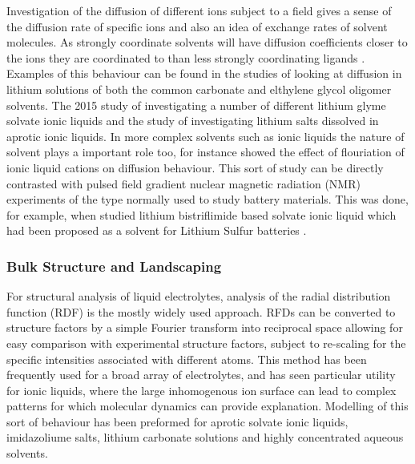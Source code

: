 \documentclass[../main.tex]{subfiles}
\begin{document}
Investigation of the diffusion of different ions subject to a field gives a sense of the diffusion rate of specific ions and also an idea of exchange rates of solvent molecules. As strongly coordinate solvents will have diffusion coefficients closer to the ions they are coordinated to than less strongly coordinating ligands \cite{shimizu_structural_2015, lesch_influence_2015, borodin_litfsi_2006,borodin_li_2006,borodin_li_2007}. Examples of this behaviour can be found in the studies of \citeauthor{borodin_li_2006} looking at diffusion in lithium solutions of both the common carbonate\cite{borodin_litfsi_2006} and elthylene glycol oligomer solvents\cite{borodin_li_2006}. The 2015 study of \citeauthor{shimizu_structural_2015} investigating a number of different lithium glyme solvate ionic liquids\cite{shimizu_structural_2015} and the study of \citeauthor{lesch_influence_2015} investigating lithium salts dissolved in aprotic ionic liquids.
In more complex solvents such as ionic liquids the nature of solvent plays a important role too, for instance \citeauthor{borodin_li_2007} showed the effect of flouriation of ionic liquid cations on diffusion behaviour\cite{borodin_li_2007}. This sort of study can be directly contrasted with pulsed field gradient nuclear magnetic radiation (NMR) experiments of the type normally used to study battery materials. This was done, for example, when \citeauthor{shimizu_structural_2015} studied lithium bistriflimide based solvate ionic liquid which had been proposed as a solvent for Lithium Sulfur batteries \cite{shimizu_structural_2015}.

\subsubsection{Bulk Structure and Landscaping}
For structural analysis of liquid electrolytes, analysis of the radial distribution function (RDF) is the mostly widely used approach. RFDs can be converted to structure factors by a simple Fourier transform into reciprocal space allowing for easy comparison with experimental structure factors\cite{shimizu_structural_2015, pethes_comparison_2017, hanke_intermolecular_2001,tsuzuki_molecular_2009}, subject to re-scaling for the specific intensities associated with different atoms. This method has been frequently used for a broad array of electrolytes, and has seen particular utility for ionic liquids, where the large inhomogenous ion surface can lead to complex patterns for which molecular dynamics can provide explanation. Modelling of this sort of behaviour has been preformed for aprotic\cite{Migliorati_2015} solvate ionic liquids\cite{shimizu_structural_2015},  imidazoliume salts\cite{hanke_intermolecular_2001}, lithium carbonate solutions\cite{Chaudhari_2018} and highly concentrated aqueous solvents\cite{pethes_comparison_2017}.
\end{document}
